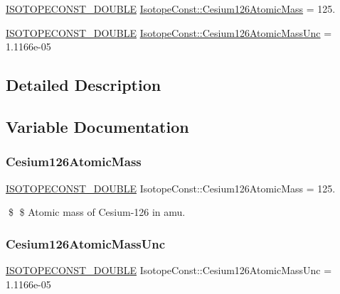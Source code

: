\begin{DoxyCompactItemize}
\item 
\mbox{\hyperlink{group___isotope_const-_macros_ga8f45a7272ce02c0b4c65c44636ed719a}{I\+S\+O\+T\+O\+P\+E\+C\+O\+N\+S\+T\+\_\+\+D\+O\+U\+B\+LE}} \mbox{\hyperlink{group___isotope_const-_cesium-_cs126_ga46b7c27a84147daa84b61b6660da8da4}{Isotope\+Const\+::\+Cesium126\+Atomic\+Mass}} = 125.
\item 
\mbox{\hyperlink{group___isotope_const-_macros_ga8f45a7272ce02c0b4c65c44636ed719a}{I\+S\+O\+T\+O\+P\+E\+C\+O\+N\+S\+T\+\_\+\+D\+O\+U\+B\+LE}} \mbox{\hyperlink{group___isotope_const-_cesium-_cs126_gace1113907599aed334f98934413e1fd6}{Isotope\+Const\+::\+Cesium126\+Atomic\+Mass\+Unc}} = 1.\+1166e-\/05
\end{DoxyCompactItemize}


\subsection{Detailed Description}


\subsection{Variable Documentation}
\mbox{\label{group___isotope_const-_cesium-_cs126_ga46b7c27a84147daa84b61b6660da8da4}} 
\subsubsection{\texorpdfstring{Cesium126\+Atomic\+Mass}{Cesium126AtomicMass}}
{\footnotesize\ttfamily \mbox{\hyperlink{group___isotope_const-_macros_ga8f45a7272ce02c0b4c65c44636ed719a}{I\+S\+O\+T\+O\+P\+E\+C\+O\+N\+S\+T\+\_\+\+D\+O\+U\+B\+LE}} Isotope\+Const\+::\+Cesium126\+Atomic\+Mass = 125.}

\$ \$ Atomic mass of Cesium-\/126 in amu. \mbox{\label{group___isotope_const-_cesium-_cs126_gace1113907599aed334f98934413e1fd6}} 
\subsubsection{\texorpdfstring{Cesium126\+Atomic\+Mass\+Unc}{Cesium126AtomicMassUnc}}
{\footnotesize\ttfamily \mbox{\hyperlink{group___isotope_const-_macros_ga8f45a7272ce02c0b4c65c44636ed719a}{I\+S\+O\+T\+O\+P\+E\+C\+O\+N\+S\+T\+\_\+\+D\+O\+U\+B\+LE}} Isotope\+Const\+::\+Cesium126\+Atomic\+Mass\+Unc = 1.\+1166e-\/05}

